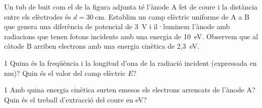Un tub de buit com el de la figura adjunta té l'ànode A fet de coure i la distància entre els elèctrodes és $d = 30\ \mathrm{cm}$. Establim un camp elèctric uniforme de A a B que genera una diferència de potencial de 3~V i il·luminem l'ànode amb radiacions que tenen fotons incidents amb una energia de 10~eV. Observem que al càtode B arriben electrons amb una energia cinètica de 2,3~eV.


\begin{apartat}{1}
Quina és la freqüència i la longitud d'ona de la radiació incident (expressada en nm)? Quin és el valor del camp elèctric $E$?
\end{apartat}

\begin{apartat}{1}
Amb quina energia cinètica surten emesos els electrons arrencats de l'ànode A? Quin és el treball d'extracció del coure en eV?
\end{apartat}

